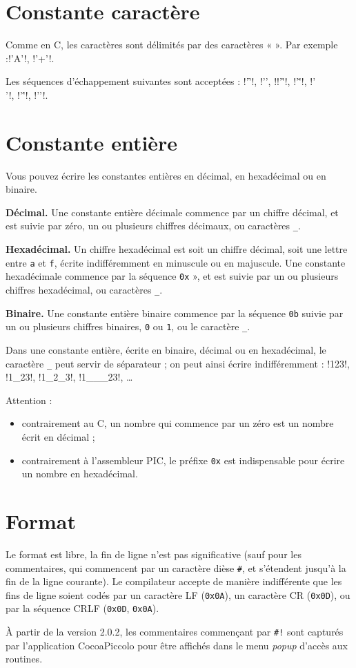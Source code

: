 \section{Constante caractère}

Comme en C, les caractères sont délimités par des caractères « \texttt{\textquotesingle} ». Par exemple :\pic!'A'!, \pic!'+'!.


Les séquences d’échappement suivantes sont acceptées : \pic!'\f'!, \pic!'\n', !\pic!'\r'!, \pic!'\v'!, \pic!'\\'!, \pic!'\''!, \pic!'\0'!.

\section{Constante entière}

Vous pouvez écrire les constantes entières en décimal, en hexadécimal ou en binaire. 

\textbf{Décimal.} Une constante entière décimale commence par un chiffre décimal, et est suivie par zéro, un ou plusieurs chiffres décimaux, ou caractères \texttt{\_}.

\textbf{Hexadécimal.} Un chiffre hexadécimal est soit un chiffre décimal, soit une lettre entre \texttt{a} et \texttt{f}, écrite indifféremment en minuscule ou en majuscule. Une constante hexadécimale commence par la séquence \texttt{0x} », et est suivie par un ou plusieurs chiffres hexadécimal, ou caractères \texttt{\_}.

\textbf{Binaire.} Une constante entière binaire commence par la séquence \texttt{0b} suivie par un ou plusieurs chiffres binaires, \texttt{0} ou \texttt{1}, ou le caractère \texttt{\_}.

Dans une constante entière, écrite en binaire, décimal ou en hexadécimal, le caractère \texttt{\_} peut servir de séparateur ; on peut ainsi écrire indifféremment : \pic!123!, \pic!1_23!, \pic!1_2_3!, \pic!1___23!, \dots

Attention :
\begin{itemize}
  \item contrairement au C, un nombre qui commence par un zéro est un nombre écrit en décimal ;
  \item contrairement à l’assembleur PIC, le préfixe \texttt{0x} est indispensable pour écrire un nombre en hexadécimal.
\end{itemize}

\section{Format}

Le format est libre, la fin de ligne n’est pas significative (sauf pour les commentaires, qui commencent par un caractère dièse \texttt{\#}, et s’étendent jusqu’à la fin de la ligne courante). Le compilateur accepte de manière indifférente que les fins de ligne soient codés par un caractère LF (\texttt{0x0A}), un caractère CR (\texttt{0x0D}), ou par la séquence CRLF (\texttt{0x0D}, \texttt{0x0A}).

À partir de la version 2.0.2, les commentaires commençant par \texttt{\#!} sont capturés par l'application CocoaPiccolo pour être affichés dans le menu \emph{popup} d'accès aux routines.

